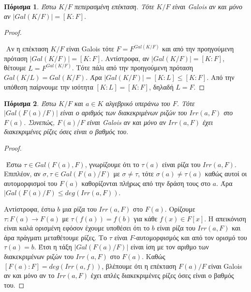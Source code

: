 \documentclass[oneside,a4paper]{article}
\newtheorem{cor}{Πόρισμα}
\newcommand {\tl}{\textlatin}
\begin{document}
\begin{cor}
	Έστω $K/F$ πεπερασμένη επέκταση. Τότε $K/F$ είναι \tl{Galois} αν και μόνο αν $|Gal(K/F)| = [K:F]$.
\end{cor}

\begin{proof} $ $
	
	$ $\newline
	Αν η επέκταση $K/F$ είναι \tl{Galois} τότε $F = F^{Gal(K/F)}$ και από την προηγούμενη πρόταση $|Gal(K/F)| = [K:F]$. Αντίστροφα, αν $|Gal(K/F)| = [K:F]$, θέτουμε $L = F^{Gal(K/F)}$. Τότε πάλι από την προηγούμενη πρόταση $Gal(K/L) = Gal(K/F)$. Άρα $|Gal(K/F)| = [K:L] \leq [K:F]$. Από την υπόθεση παίρνουμε την ισότητα $[K:L] = [K:F]$, δηλαδή $L = F$.

\end{proof}

\begin{cor} Έστω $K/F$ και $a\in K$ αλγεβρικό υπεράνω του $F$. Τότε $|Gal(F(a)/F)|$ είναι ο αριθμός των διακεκριμένων ριζών του $Irr(a,F)$ στο $F(a)$. Συνεπώς, $F(a)/F$ είναι \tl{Galois} αν και μόνο αν $Irr(a,F)$ έχει διακεκριμένες ρίζες όσες είναι ο βαθμός του.
\end{cor}

\begin{proof} $ $

	$ $\newline
	Έστω $\tau \in Gal(F(a),F)$, γνωρίζουμε ότι το $\tau (a)$ είναι ρίζα του $Irr(a,F)$. Επιπλέον, αν $\sigma , \tau \in Gal(F(a)/F)$ με $\sigma \neq \tau$, τότε $\sigma (a) \neq \tau (a)$ καθώς αυτοί οι αυτομορφισμοί του $F(a)$ καθορίζονται πλήρως από την δράση τους στο $a$. Άρα $|Gal(F(a)/F) \leq deg\left( Irr(a,F)\right)$.

	Αντίστροφα, έστω $b$ μια ρίζα του $Irr(a,F)$ στο $F(a)$. Ορίζουμε $\tau : F(a) \rightarrow F(a)$ με $\tau(f(a)) = f(b)$ για κάθε $f(x) \in F[x]$. Η απεικόνιση είναι καλά ορισμένη εφόσον έχουμε υποθέσει ότι το $b$ είναι ρίζα του $Irr(a,F)$ και άρα πράγματι μεταθέτουμε ρίζες. Το $\tau$ είναι $F$-αυτομορφισμός και από τον ορισμό του $\tau (a) = b$. Έτσι η τάξη $|Gal(F(a)/F)|$ είναι ίση με τον αριθμο των διακεκριμένων ριζών του $Irr(a,F)$ στο $F(a)$. Καθώς $[F(a) : F] = deg(Irr(a,f))$, βλέπουμε ότι η επέκταση $F(a)/F$ είναι \tl{Galois} αν και μόνο αν το $Irr(a,F)$ έχει απλές διακεκριμένες ρίζες όσες είναι ο βαθμός του.
\end{proof}
\end{document}
